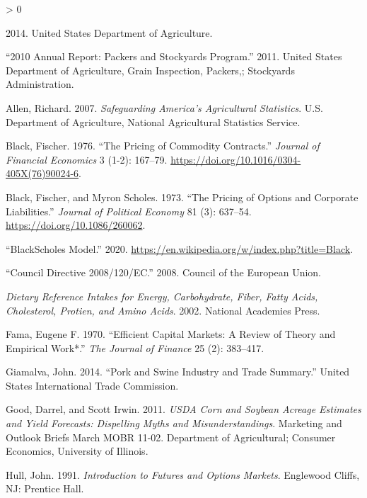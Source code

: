 \documentclass[
]{book}
\newlength{\cslhangindent}
\newenvironment{CSLReferences}[2] %
 {%
  \setlength{\parindent}{0pt}
  \ifodd #1 \everypar{\setlength{\hangindent}{\cslhangindent}}\ignorespaces\fi
  \ifnum #2 > 0
  \setlength{\parskip}{#2\baselineskip}
  \fi
 }%
 {}
\begin{document}
\hypertarget{refs}{}
\begin{CSLReferences}{1}{0}
\leavevmode\hypertarget{ref-usdacensus}{}%
2014. United States Department of Agriculture.

\leavevmode\hypertarget{ref-gipsa10}{}%
{``2010 Annual Report: Packers and Stockyards Program.''} 2011. United States Department of Agriculture, Grain Inspection, Packers,; Stockyards Administration.

\leavevmode\hypertarget{ref-history2007Nass}{}%
Allen, Richard. 2007. \emph{Safeguarding America's Agricultural Statistics}. U.S. Department of Agriculture, National Agricultural Statistics Service.

\leavevmode\hypertarget{ref-black1976}{}%
Black, Fischer. 1976. {``The Pricing of Commodity Contracts.''} \emph{Journal of Financial Economics} 3 (1-2): 167--79. \url{https://doi.org/10.1016/0304-405X(76)90024-6}.

\leavevmode\hypertarget{ref-black1973}{}%
Black, Fischer, and Myron Scholes. 1973. {``The Pricing of Options and Corporate Liabilities.''} \emph{Journal of Political Economy} 81 (3): 637--54. \url{https://doi.org/10.1086/260062}.

\leavevmode\hypertarget{ref-blacksc2020}{}%
{``Black{{}}Scholes Model.''} 2020. \url{https://en.wikipedia.org/w/index.php?title=Black}.

\leavevmode\hypertarget{ref-eugestation}{}%
{``Council Directive 2008/120/EC.''} 2008. Council of the European Union.

\leavevmode\hypertarget{ref-dri2002Nap}{}%
\emph{Dietary Reference Intakes for Energy, Carbohydrate, Fiber, Fatty Acids, Cholesterol, Protien, and Amino Acids}. 2002. National Academies Press.

\leavevmode\hypertarget{ref-fama1970efficient}{}%
Fama, Eugene F. 1970. {``Efficient Capital Markets: A Review of Theory and Empirical Work*.''} \emph{The Journal of Finance} 25 (2): 383--417.

\leavevmode\hypertarget{ref-usitctrade}{}%
Giamalva, John. 2014. {``Pork and Swine Industry and Trade Summary.''} United States International Trade Commission.

\leavevmode\hypertarget{ref-good2011yield}{}%
Good, Darrel, and Scott Irwin. 2011. \emph{USDA Corn and Soybean Acreage Estimates and Yield Forecasts: Dispelling Myths and Misunderstandings}. Marketing and Outlook Briefs March MOBR 11-02. Department of Agricultural; Consumer Economics, University of Illinois.

\leavevmode\hypertarget{ref-hull1991introduction}{}%
Hull, John. 1991. \emph{Introduction to Futures and Options Markets}. Englewood Cliffs, NJ: Prentice Hall.


\end{CSLReferences}
\end{document}

